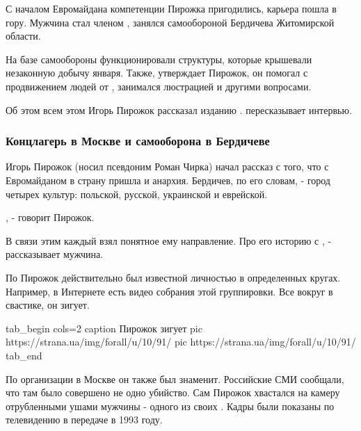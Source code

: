 С началом Евромайдана компетенции Пирожка пригодились, карьера пошла в
гору. Мужчина стал членом , занялся самообороной
Бердичева Житомирской области. 

На базе самообороны функционировали структуры, которые крышевали
незаконную добычу января. Также, утверждает Пирожок, он помогал с
продвижением людей от , занимался люстрацией и
другими вопросами. 

Об этом всем этом Игорь Пирожок рассказал изданию . 
пересказывает интервью.

\subsubsection{Концлагерь в Москве и самооборона в Бердичеве}

Игорь Пирожок (носил псевдоним Роман Чирка) начал рассказ с того, что с
Евромайданом в страну пришла и анархия. Бердичев, по его словам, - город
четырех культур: польской, русской, украинской и еврейской.

, - говорит Пирожок. 

В связи этим каждый взял понятное ему направление. Про его историю с
, - рассказывает мужчина. 

По  Пирожок действительно был известной личностью в
определенных кругах. Например, в Интернете есть видео собрания этой
группировки. Все вокруг в свастике, он зигует. 

\ifcmt
tab_begin cols=2
	caption Пирожок зигует
	pic https://strana.ua/img/forall/u/10/91/%
	pic https://strana.ua/img/forall/u/10/91/%
tab_end 
\fi


По организации  в Москве он также был знаменит. Российские СМИ
сообщали, что там было совершено не одно убийство. Сам Пирожок хвастался
на камеру отрубленными ушами мужчины - одного из своих . Кадры были
показаны по телевидению в передаче  в 1993 году. 

